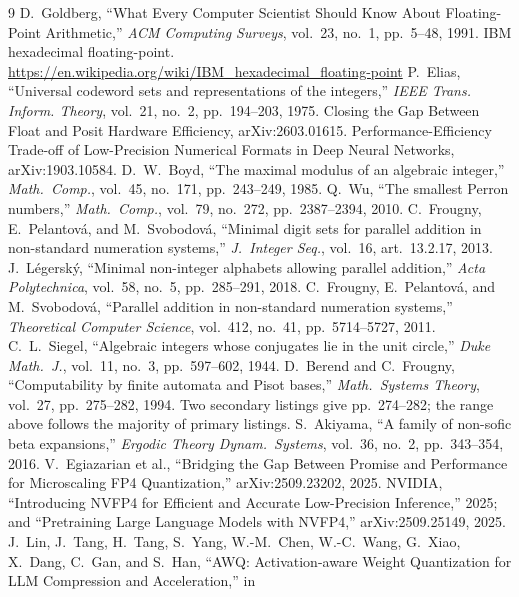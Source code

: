 \documentclass[11pt]{article}
\theoremstyle{definition}
\begin{document}
\begin{thebibliography}{9}
 D.~Goldberg, ``What Every Computer Scientist Should Know About Floating-Point Arithmetic,'' \emph{ACM Computing Surveys}, vol.~23, no.~1, pp.~5--48, 1991.
 IBM hexadecimal floating-point. \url{https://en.wikipedia.org/wiki/IBM_hexadecimal_floating-point}
 P.~Elias, ``Universal codeword sets and representations of the integers,'' \emph{IEEE Trans. Inform. Theory}, vol.~21, no.~2, pp.~194--203, 1975.
 Closing the Gap Between Float and Posit Hardware Efficiency, arXiv:2603.01615.
 Performance-Efficiency Trade-off of Low-Precision Numerical Formats in Deep Neural Networks, arXiv:1903.10584.
 D.~W.~Boyd, ``The maximal modulus of an algebraic integer,''
\emph{Math.\ Comp.}, vol.~45, no.~171, pp.~243--249, 1985.
 Q.~Wu, ``The smallest Perron numbers,'' \emph{Math.\ Comp.},
vol.~79, no.~272, pp.~2387--2394, 2010.
 C.~Frougny, E.~Pelantov\'a, and M.~Svobodov\'a,
``Minimal digit sets for parallel addition in non-standard numeration systems,''
\emph{J.\ Integer Seq.}, vol.~16, art.~13.2.17, 2013.
 J.~L\'egersk\'y, ``Minimal non-integer alphabets
allowing parallel addition,'' \emph{Acta Polytechnica}, vol.~58, no.~5,
pp.~285--291, 2018.
 C.~Frougny, E.~Pelantov\'a, and M.~Svobodov\'a,
``Parallel addition in non-standard numeration systems,'' \emph{Theoretical
Computer Science}, vol.~412, no.~41, pp.~5714--5727, 2011.
 C.~L.~Siegel, ``Algebraic integers whose conjugates lie in
the unit circle,'' \emph{Duke Math.\ J.}, vol.~11, no.~3, pp.~597--602, 1944.
 D.~Berend and C.~Frougny, ``Computability by finite automata
and Pisot bases,'' \emph{Math.\ Systems Theory}, vol.~27, pp.~275--282, 1994.
Two secondary listings give pp.~274--282; the range above follows the majority of
primary listings.
 S.~Akiyama, ``A family of non-sofic beta expansions,''
\emph{Ergodic Theory Dynam.\ Systems}, vol.~36, no.~2, pp.~343--354, 2016.
 V.~Egiazarian et al., ``Bridging the Gap Between Promise and
Performance for Microscaling FP4 Quantization,'' arXiv:2509.23202, 2025.
 NVIDIA, ``Introducing NVFP4 for Efficient and Accurate
Low-Precision Inference,'' 2025; and ``Pretraining Large Language Models with
NVFP4,'' arXiv:2509.25149, 2025.
 J.~Lin, J.~Tang, H.~Tang, S.~Yang, W.-M.~Chen, W.-C.~Wang,
G.~Xiao, X.~Dang, C.~Gan, and S.~Han, ``AWQ: Activation-aware Weight
Quantization for LLM Compression and Acceleration,'' in

\end{thebibliography}
\end{document}
